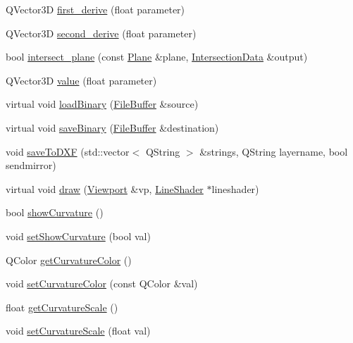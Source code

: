 \begin{DoxyCompactItemize}
\item 
Q\-Vector3\-D \hyperlink{classShipCAD_1_1Spline_afe15664ac97d1d3452d5a5cfd023c471}{first\-\_\-derive} (float parameter)
\item 
Q\-Vector3\-D \hyperlink{classShipCAD_1_1Spline_abe04c117432e350f3a9f66395d2d3037}{second\-\_\-derive} (float parameter)
\item 
bool \hyperlink{classShipCAD_1_1Spline_afd932e0c63a3b03200ecdc7c656be8e4}{intersect\-\_\-plane} (const \hyperlink{classShipCAD_1_1Plane}{Plane} \&plane, \hyperlink{classShipCAD_1_1IntersectionData}{Intersection\-Data} \&output)
\item 
Q\-Vector3\-D \hyperlink{classShipCAD_1_1Spline_a589d6d945e0fbb905ea94907cd216165}{value} (float parameter)
\item 
virtual void \hyperlink{classShipCAD_1_1Spline_ae90c8807fb8058d6309f47db64e2d40e}{load\-Binary} (\hyperlink{classShipCAD_1_1FileBuffer}{File\-Buffer} \&source)
\item 
virtual void \hyperlink{classShipCAD_1_1Spline_abaf1c6eebdfe8abd41287c1fcb38a808}{save\-Binary} (\hyperlink{classShipCAD_1_1FileBuffer}{File\-Buffer} \&destination)
\item 
void \hyperlink{classShipCAD_1_1Spline_a347502f38c64a12fc19a95e19aad5d7d}{save\-To\-D\-X\-F} (std\-::vector$<$ Q\-String $>$ \&strings, Q\-String layername, bool sendmirror)
\item 
virtual void \hyperlink{classShipCAD_1_1Spline_a6424ed433d241f566c15891cc25a74dd}{draw} (\hyperlink{classShipCAD_1_1Viewport}{Viewport} \&vp, \hyperlink{classShipCAD_1_1LineShader}{Line\-Shader} $\ast$lineshader)
\item 
bool \hyperlink{classShipCAD_1_1Spline_a2c232b5ca5da62ba07ec9aa8ede3fd17}{show\-Curvature} ()
\item 
void \hyperlink{classShipCAD_1_1Spline_aae0f5ce3bc2aa58759abd32f3462bf16}{set\-Show\-Curvature} (bool val)
\item 
Q\-Color \hyperlink{classShipCAD_1_1Spline_ae2e47ccb73a45e0f0d2df2484ba509ae}{get\-Curvature\-Color} ()
\item 
void \hyperlink{classShipCAD_1_1Spline_ac40c22712433f98d657ecaed459d03a0}{set\-Curvature\-Color} (const Q\-Color \&val)
\item 
float \hyperlink{classShipCAD_1_1Spline_ade326d9cd43b6523516b1113b0bddd1b}{get\-Curvature\-Scale} ()
\item 
void \hyperlink{classShipCAD_1_1Spline_a17ba0378bfd4a39b4d96d914332c26e4}{set\-Curvature\-Scale} (float val)
\item 

\end{DoxyCompactItemize}
